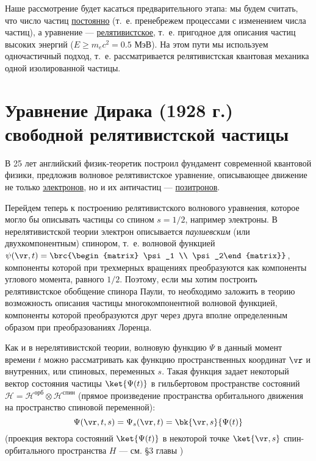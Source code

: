 Наше рассмотрение будет касаться предварительного этапа: мы будем считать, что число частиц \underline{постоянно} (т.~е. пренебрежем процессами с изменением числа частиц), а уравнение --- \underline{релятивистское}, т.~е. пригодное для описания частиц высоких энергий (${E \ge m_e c^2 = 0.5}$ МэВ). На этом пути мы используем одночастичный подход, т.~е. рассматривается релятивистская квантовая механика одной изолированной частицы.

\section{Уравнение Дирака (1928 г.) свободной релятивистской частицы}

В 25 лет английский физик-теоретик построил фундамент современной квантовой физики, предложив волновое релятивистское уравнение, описывающее движение не только \underline{электронов}, но и их античастиц --- \underline{позитронов}.

Перейдем теперь к построению релятивистского волнового уравнения, которое могло бы описывать частицы со спином $s = 1/2$, например электроны. В нерелятивистской теории электрон описывается {\em паулиевским} (или двухкомпонентным) спинором, т.~е. волновой функцией $\psi(\vr, t) = \brc{\begin{matrix} \psi_1 \\ \psi_2\end{matrix}}$, компоненты которой при трехмерных вращениях преобразуются как компоненты углового момента, равного $1/2$. Поэтому, если мы хотим построить релятивистское обобщение спинора Паули, то необходимо заложить в теорию возможность описания частицы многокомпонентной волновой функцией, компоненты которой преобразуются друг через друга вполне определенным образом при преобразованиях Лоренца.

Как и в нерелятивистской теории, волновую функцию $\Psi$ в данный момент времени $t$ можно рассматривать как функцию пространственных координат $\vr$ и внутренних, или спиновых, переменных $s$. Такая функция задает некоторый вектор состояния частицы $\ket{\Psi(t)}$ в гильбертовом пространстве состояний $\mathcal{H} = \mathcal{H}^{\text{орб}} \otimes \mathcal{H}^{\text{спин}}$ (прямое произведение пространства орбитального движения на пространство спиновой переменной):
$$
\Psi(\vr, t, s) = \Psi_s(\vr, t) = \bk{\vr, s}{\Psi(t)}
$$
(проекция вектора состояний $\ket{\Psi(t)}$ в некоторой точке $\ket{\vr, s}$ спин-орбитального пространства $H$ --- см. \S 3 главы )

